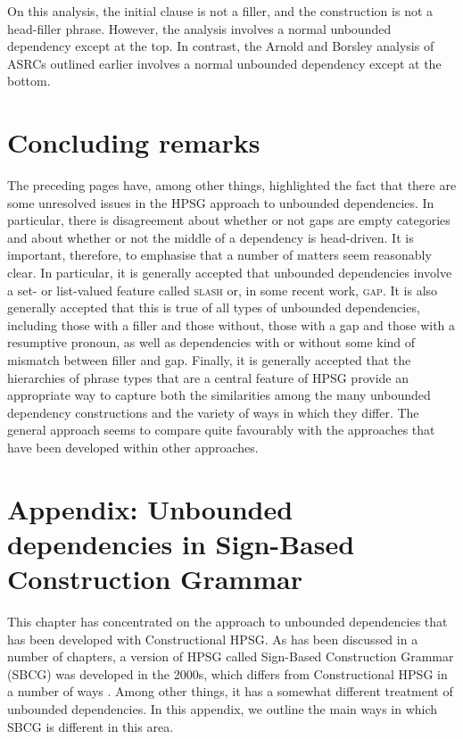 \documentclass[output=paper
,notxmath 
	        ,collection
	        ,collectionchapter
 	        ,biblatex
                ,babelshorthands
                ,newtxmath
                ,draftmode
                ,colorlinks, citecolor=brown
]{langscibook}
\begin{document}
\noindent
On this analysis, the initial clause is not a filler, and the
construction is not a head-filler phrase. However, the analysis involves
a normal unbounded dependency except at the top. In contrast, the Arnold
and Borsley analysis of ASRCs outlined earlier involves a normal
unbounded dependency except at the bottom.


\section{Concluding remarks}
\label{sec:UDC:ConcludingRemarks}

The preceding pages have, among other things, highlighted the fact
that there are some unresolved issues in the HPSG approach to
unbounded dependencies. In particular, there is disagreement about
whether or not gaps are empty categories and about whether or not the
middle of a dependency is head-driven. It is important, therefore, to
emphasise that a number of matters seem reasonably clear. In
particular, it is generally accepted that unbounded dependencies
involve a set- or list-valued feature called \textsc{slash} or, in
some recent work, \textsc{gap}. It is also generally accepted that
this is true of all types of unbounded dependencies, including those
with a filler and those without, those with a gap and those with a
resumptive pronoun, as well as dependencies with or without some kind
of mismatch between filler and gap. Finally, it is generally accepted
that the hierarchies of phrase types that are a central feature of
HPSG provide an appropriate way to capture both the similarities among
the many unbounded dependency constructions and the variety of ways in
which they differ. The general approach seems to compare quite
favourably with the approaches that have been developed within other
approaches.

\section*{Appendix: Unbounded dependencies in Sign-Based Construction Grammar}

This chapter has concentrated on the approach to unbounded
dependencies that has been developed with Constructional HPSG. As
has been discussed in a number of chapters, a version of HPSG called
Sign-Based Construction Grammar (SBCG) was developed in the 2000s,
which differs from Constructional HPSG in a number of ways
\citep{Sag:12}. Among other things, it has a somewhat different
treatment of unbounded dependencies. In this appendix, we outline the
main ways in which SBCG is different in this area.
\end{document}
